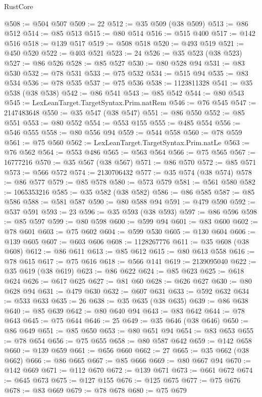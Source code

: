 \begin{lexlean}{RustCore}
\begin{coremodule}
@508 := @504 @507
@509 := 22
@512 := @35 @509 (@38 @509)
@513 := @86 @512
@514 := @85 @513
@515 := @80 @514
@516 := @515 @400
@517 := @142 @516
@518 := @139 @517
@519 := @508 @518
@520 := @493 @519
@521 := @450 @520
@522 := @403 @521
@523 := 24
@526 := @35 @523 (@38 @523)
@527 := @86 @526
@528 := @85 @527
@530 := @80 @528 @94
@531 := @83 @530
@532 := @78 @531
@533 := @75 @532
@534 := @515 @94
@535 := @83 @534
@536 := @78 @535
@537 := @75 @536
@538 := 1123811328
@541 := @35 @538 (@38 @538)
@542 := @86 @541
@543 := @85 @542
@544 := @80 @543
@545 := LexLeanTarget.TargetSyntax.Prim.natRem
@546 := @76 @545
@547 := 2147483648
@550 := @35 @547 (@38 @547)
@551 := @86 @550
@552 := @85 @551
@553 := @80 @552
@554 := @553 @155
@555 := @485 @554
@556 := @546 @555
@558 := @80 @556 @94
@559 := @544 @558
@560 := @78 @559
@561 := @75 @560
@562 := LexLeanTarget.TargetSyntax.Prim.natLe
@563 := @76 @562
@564 := @553 @486
@565 := @563 @564
@566 := @75 @565
@567 := 16777216
@570 := @35 @567 (@38 @567)
@571 := @86 @570
@572 := @85 @571
@573 := @566 @572
@574 := 2130706432
@577 := @35 @574 (@38 @574)
@578 := @86 @577
@579 := @85 @578
@580 := @573 @579
@581 := @561 @580
@582 := 1065353216
@585 := @35 @582 (@38 @582)
@586 := @86 @585
@587 := @85 @586
@588 := @581 @587
@590 := @80 @588 @94
@591 := @479 @590
@592 := @537 @591
@593 := 23
@596 := @35 @593 (@38 @593)
@597 := @86 @596
@598 := @85 @597
@599 := @80 @598
@600 := @599 @94
@601 := @83 @600
@602 := @78 @601
@603 := @75 @602
@604 := @599 @530
@605 := @130 @604
@606 := @139 @605
@607 := @603 @606
@608 := 1128267776
@611 := @35 @608 (@38 @608)
@612 := @86 @611
@613 := @85 @612
@615 := @80 @613 @558
@616 := @78 @615
@617 := @75 @616
@618 := @566 @141
@619 := 2139095040
@622 := @35 @619 (@38 @619)
@623 := @86 @622
@624 := @85 @623
@625 := @618 @624
@626 := @617 @625
@627 := @81 @60
@628 := @626 @627
@630 := @80 @628 @94
@631 := @479 @630
@632 := @607 @631
@633 := @592 @632
@634 := @533 @633
@635 := 26
@638 := @35 @635 (@38 @635)
@639 := @86 @638
@640 := @85 @639
@642 := @80 @640 @94
@643 := @83 @642
@644 := @78 @643
@645 := @75 @644
@646 := 25
@649 := @35 @646 (@38 @646)
@650 := @86 @649
@651 := @85 @650
@653 := @80 @651 @94
@654 := @83 @653
@655 := @78 @654
@656 := @75 @655
@658 := @80 @587 @642
@659 := @142 @658
@660 := @139 @659
@661 := @656 @660
@662 := 27
@665 := @35 @662 (@38 @662)
@666 := @86 @665
@667 := @85 @666
@669 := @80 @667 @94
@670 := @142 @669
@671 := @112 @670
@672 := @139 @671
@673 := @661 @672
@674 := @645 @673
@675 := @127 @155
@676 := @125 @675
@677 := @75 @676
@678 := @83 @669
@679 := @78 @678
@680 := @75 @679

\end{coremodule}
\end{lexlean}
